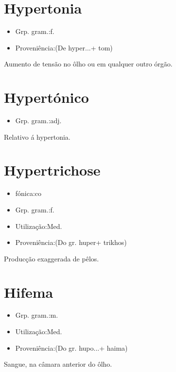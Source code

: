 \documentclass{article}
\begin{document}
\section{Hypertonia}
\begin{itemize}
\item {Grp. gram.:f.}
\end{itemize}
\begin{itemize}
\item {Proveniência:(De \textunderscore hyper...\textunderscore  + \textunderscore tom\textunderscore )}
\end{itemize}
Aumento de tensão no ôlho ou em qualquer outro órgão.
\section{Hypertónico}
\begin{itemize}
\item {Grp. gram.:adj.}
\end{itemize}
Relativo á hypertonia.
\section{Hypertrichose}
\begin{itemize}
\item {fónica:co}
\end{itemize}
\begin{itemize}
\item {Grp. gram.:f.}
\end{itemize}
\begin{itemize}
\item {Utilização:Med.}
\end{itemize}
\begin{itemize}
\item {Proveniência:(Do gr. \textunderscore huper\textunderscore  + \textunderscore trikhos\textunderscore )}
\end{itemize}
Producção exaggerada de pêlos.
\section{Hifema}
\begin{itemize}
\item {Grp. gram.:m.}
\end{itemize}
\begin{itemize}
\item {Utilização:Med.}
\end{itemize}
\begin{itemize}
\item {Proveniência:(Do gr. \textunderscore hupo...\textunderscore  + \textunderscore haima\textunderscore )}
\end{itemize}
Sangue, na câmara anterior do ôlho.
\end{document}
